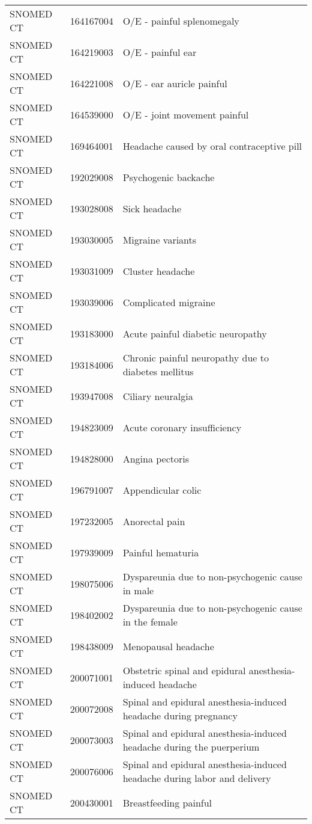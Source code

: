 \begin{longtable}{p{}p{}p{}}
  SNOMED CT & 164167004 & O/E - painful splenomegaly \\ 
  SNOMED CT & 164219003 & O/E - painful ear \\ 
  SNOMED CT & 164221008 & O/E - ear auricle painful \\ 
  SNOMED CT & 164539000 & O/E - joint movement painful \\ 
  SNOMED CT & 169464001 & Headache caused by oral contraceptive pill \\ 
  SNOMED CT & 192029008 & Psychogenic backache \\ 
  SNOMED CT & 193028008 & Sick headache \\ 
  SNOMED CT & 193030005 & Migraine variants \\ 
  SNOMED CT & 193031009 & Cluster headache \\ 
  SNOMED CT & 193039006 & Complicated migraine \\ 
  SNOMED CT & 193183000 & Acute painful diabetic neuropathy \\ 
  SNOMED CT & 193184006 & Chronic painful neuropathy due to diabetes mellitus \\ 
  SNOMED CT & 193947008 & Ciliary neuralgia \\ 
  SNOMED CT & 194823009 & Acute coronary insufficiency \\ 
  SNOMED CT & 194828000 & Angina pectoris \\ 
  SNOMED CT & 196791007 & Appendicular colic \\ 
  SNOMED CT & 197232005 & Anorectal pain \\ 
  SNOMED CT & 197939009 & Painful hematuria \\ 
  SNOMED CT & 198075006 & Dyspareunia due to non-psychogenic cause in male \\ 
  SNOMED CT & 198402002 & Dyspareunia due to non-psychogenic cause in the female \\ 
  SNOMED CT & 198438009 & Menopausal headache \\ 
  SNOMED CT & 200071001 & Obstetric spinal and epidural anesthesia-induced headache \\ 
  SNOMED CT & 200072008 & Spinal and epidural anesthesia-induced headache during pregnancy \\ 
  SNOMED CT & 200073003 & Spinal and epidural anesthesia-induced headache during the puerperium \\ 
  SNOMED CT & 200076006 & Spinal and epidural anesthesia-induced headache during labor and delivery \\ 
  SNOMED CT & 200430001 & Breastfeeding painful \\ 

\end{longtable}
